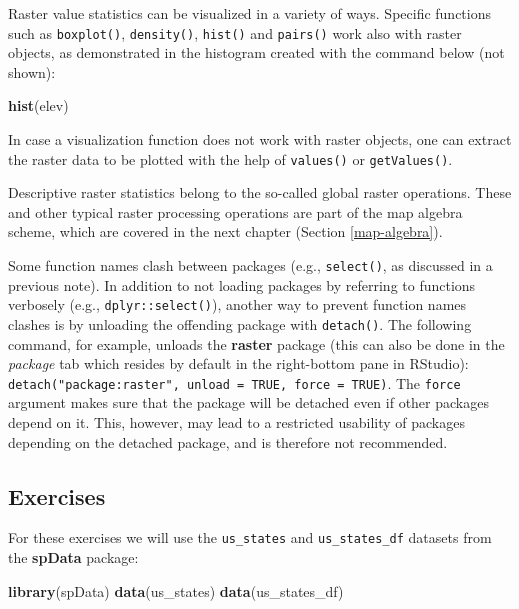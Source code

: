 \documentclass[]{krantz}
\makeatletter
\newenvironment{Shaded}{\begin{snugshade}}{\end{snugshade}}
\newcommand{\KeywordTok}[1]{\textcolor[rgb]{0.27,0.27,0.27}{\textbf{#1}}}
\newcommand{\NormalTok}[1]{#1}
\newenvironment{kframe}{%
\medskip{}
\setlength{\fboxsep}{.8em}
 \def\at@end@of@kframe{}%
 \ifinner\ifhmode%
  \def\at@end@of@kframe{\end{minipage}}%
  \begin{minipage}{\columnwidth}%
 \fi\fi%
 \def\FrameCommand##1{\hskip\@totalleftmargin \hskip-\fboxsep
 \colorbox{shadecolor}{##1}\hskip-\fboxsep
     \hskip-\linewidth \hskip-\@totalleftmargin \hskip\columnwidth}%
 \MakeFramed {\advance\hsize-\width
   \@totalleftmargin\z@ \linewidth\hsize
   \@setminipage}}%
 {\par\unskip\endMakeFramed%
 \at@end@of@kframe}
\newenvironment{rmdblock}[1]
  {
  \begin{itemize}
  \renewcommand{\labelitemi}{
    \raisebox{-.7\height}[0pt][0pt]{
      {\setkeys{Gin}{width=3em,keepaspectratio}\texttt{[image: images/\#1]}}
    }
  }
  \setlength{\fboxsep}{1em}
  \begin{kframe}
  \item
  }
  {
  \end{kframe}
  \end{itemize}
  }
\newenvironment{rmdnote}
  {\begin{rmdblock}{note}}
  {\end{rmdblock}}
\makeatother
\begin{document}
Raster value statistics can be visualized in a variety of ways.
Specific functions such as \texttt{boxplot()}, \texttt{density()}, \texttt{hist()} and \texttt{pairs()} work also with raster objects, as demonstrated in the histogram created with the command below (not shown):

\begin{Shaded}
\begin{Highlighting}[]
\KeywordTok{hist}\NormalTok{(elev)}
\end{Highlighting}
\end{Shaded}

In case a visualization function does not work with raster objects, one can extract the raster data to be plotted with the help of \texttt{values()} or \texttt{getValues()}.

Descriptive raster statistics belong to the so-called global raster operations.
These and other typical raster processing operations are part of the map algebra scheme, which are covered in the next chapter (Section \ref{map-algebra}).

\begin{rmdnote}
Some function names clash between packages (e.g., \texttt{select()}, as
discussed in a previous note). In addition to not loading packages by
referring to functions verbosely (e.g., \texttt{dplyr::select()}),
another way to prevent function names clashes is by unloading the
offending package with \texttt{detach()}. The following command, for
example, unloads the \textbf{raster} package (this can also be done in
the \emph{package} tab which resides by default in the right-bottom pane
in RStudio):
\texttt{detach("package:raster",\ unload\ =\ TRUE,\ force\ =\ TRUE)}.
The \texttt{force} argument makes sure that the package will be detached
even if other packages depend on it. This, however, may lead to a
restricted usability of packages depending on the detached package, and
is therefore not recommended.
\end{rmdnote}

\hypertarget{exercises-1}{%
\subsection{Exercises}\label{exercises-1}}

For these exercises we will use the \texttt{us\_states} and \texttt{us\_states\_df} datasets from the \textbf{spData} package:

\begin{Shaded}
\begin{Highlighting}[]
\KeywordTok{library}\NormalTok{(spData)}
\KeywordTok{data}\NormalTok{(us_states)}
\KeywordTok{data}\NormalTok{(us_states_df)}
\end{Highlighting}
\end{Shaded}
\end{document}
